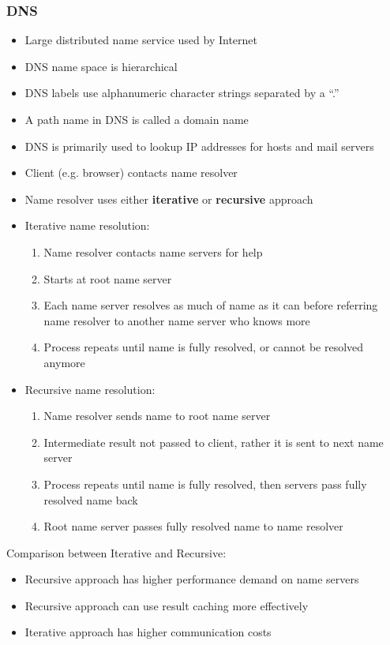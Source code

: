 \subsubsection{DNS}
\begin{itemize}
	\item Large distributed name service used by Internet
	\item DNS name space is hierarchical
	\item DNS labels use alphanumeric character strings separated by a ``.''
	\item A path name in DNS is called a domain name
	\item DNS is primarily used to lookup IP addresses for hosts and mail servers
	\item Client (e.g. browser) contacts name resolver
	\item Name resolver uses either \textbf{iterative} or \textbf{recursive} approach
	\item Iterative name resolution:
	\begin{enumerate}
		\item Name resolver contacts name servers for help
		\item Starts at root name server
		\item Each name server resolves as much of name as it can before referring name resolver to another name server who knows more
		\item Process repeats until name is fully resolved, or cannot be resolved anymore
	\end{enumerate}	
	\item Recursive name resolution:
	\begin{enumerate}
		\item Name resolver sends name to root name server
		\item Intermediate result not passed to client, rather it is sent to next name server
		\item Process repeats until name is fully resolved, then servers pass fully resolved name back
		\item Root name server passes fully resolved name to name resolver
	\end{enumerate}
\end{itemize}
Comparison between Iterative and Recursive:
\begin{itemize}
	\item Recursive approach has higher performance demand on name servers
	\item Recursive approach can use result caching more effectively
	\item Iterative approach has higher communication costs	
\end{itemize}

